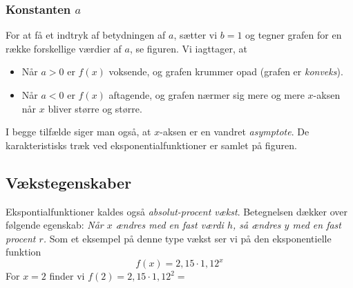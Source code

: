 \documentclass[12pt,oneside,a4paper]{article}
\begin{document}
\subsubsection{Konstanten $a$}
For at få et indtryk af betydningen af $a$, sætter vi $b=1$ og tegner grafen
for en række forskellige værdier af $a$, se figuren. Vi iagttager, at 
\begin{itemize}
    \item Når $a>0$ er $f(x)$ voksende, og grafen krummer opad (grafen er {\em konveks}).
    \item Når $a<0$ er $f(x)$ aftagende, og grafen nærmer sig mere og mere
        $x$-aksen når $x$ bliver større og større.
\end{itemize}
I begge tilfælde siger man også, at $x$-aksen er en vandret {\em asymptote}.
De karakteristisks træk ved eksponentialfunktioner er samlet på figuren.

\subsection{Vækstegenskaber}
Ekspontialfunktioner kaldes også {\em absolut-procent vækst}. Betegnelsen dækker over følgende egenskab:
{\em Når $x$ ændres med en fast værdi $h$, så ændres $y$ med en fast procent $r$.}
Som et eksempel på denne type vækst ser vi på den eksponentielle funktion
$$
f(x) = 2,15 \cdot 1,12^x
$$
For $x=2$ finder vi $f(2) = 2,15 \cdot 1,12^2 = $
\end{document}
